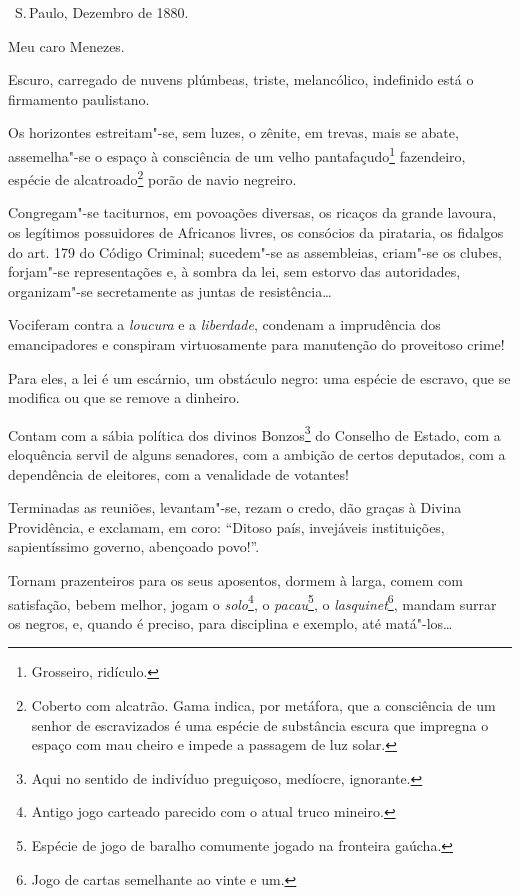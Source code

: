 \hfill\ S.\,Paulo, Dezembro de 1880.\bigskip

\noindent{}Meu caro Menezes.\smallskip

Escuro, carregado de nuvens plúmbeas, triste, melancólico, indefinido
está o firmamento paulistano.

Os horizontes estreitam"-se, sem luzes, o zênite, em trevas, mais se
abate, assemelha"-se o espaço à consciência de um velho
pantafaçudo\footnote{Grosseiro, ridículo.} fazendeiro, espécie de
alcatroado\footnote{Coberto com alcatrão. Gama indica, por metáfora,
  que a consciência de um senhor de escravizados é uma espécie de
  substância escura que impregna o espaço com mau cheiro e impede a
  passagem de luz solar.} porão de navio negreiro.

Congregam"-se taciturnos, em povoações diversas, os ricaços da grande
lavoura, os legítimos possuidores de Africanos livres, os consócios da
pirataria, os fidalgos do art. 179 do Código Criminal; sucedem"-se as
assembleias, criam"-se os clubes, forjam"-se representações e, à sombra da
lei, sem estorvo das autoridades, organizam"-se secretamente as juntas de
resistência\ldots{}

Vociferam contra a \emph{loucura} e a \emph{liberdade}, condenam a
imprudência dos emancipadores e conspiram virtuosamente para manutenção
do proveitoso crime!

Para eles, a lei é um escárnio, um obstáculo negro: uma espécie de
escravo, que se modifica ou que se remove a dinheiro.

Contam com a sábia política dos divinos Bonzos\footnote{Aqui no
  sentido de indivíduo preguiçoso, medíocre, ignorante.} do Conselho de
Estado, com a eloquência servil de alguns senadores, com a ambição de
certos deputados, com a dependência de eleitores, com a venalidade de
votantes!

Terminadas as reuniões, levantam"-se, rezam o credo, dão graças à Divina
Providência, e exclamam, em coro: ``Ditoso país, invejáveis instituições,
sapientíssimo governo, abençoado povo!''.

Tornam prazenteiros para os seus aposentos, dormem à larga, comem com
satisfação, bebem melhor, jogam o \emph{solo}\footnote{Antigo jogo
  carteado parecido com o atual truco mineiro.}, o
\emph{pacau}\footnote{Espécie de jogo de baralho comumente jogado na
  fronteira gaúcha.}, o \emph{lasquinet}\footnote{Jogo de cartas
  semelhante ao vinte e um.}, mandam surrar os negros, e,
quando é preciso, para disciplina e exemplo, até matá"-los\ldots{}

